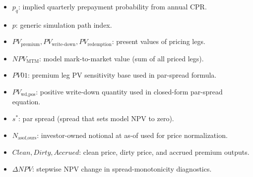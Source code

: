 \documentclass[11pt]{article}
\begin{document}
\begin{itemize}
  \item \(p_q\): implied quarterly prepayment probability from annual CPR.
  \item \(p\): generic simulation path index.
  \item \(PV_{\text{premium}}, PV_{\text{write-down}}, PV_{\text{redemption}}\): present values of pricing legs.
  \item \(NPV_{\text{MTM}}\): model mark-to-market value (sum of all priced legs).
  \item \(PV01\): premium leg PV sensitivity base used in par-spread formula.
  \item \(PV_{\text{wd,pos}}\): positive write-down quantity used in closed-form par-spread equation.
  \item \(s^*\): par spread (spread that sets model NPV to zero).
  \item \(N_{\text{asof,ours}}\): investor-owned notional at as-of used for price normalization.
  \item \(Clean, Dirty, Accrued\): clean price, dirty price, and accrued premium outputs.
  \item \(\Delta NPV\): stepwise NPV change in spread-monotonicity diagnostics.
\end{itemize}
\end{document}
